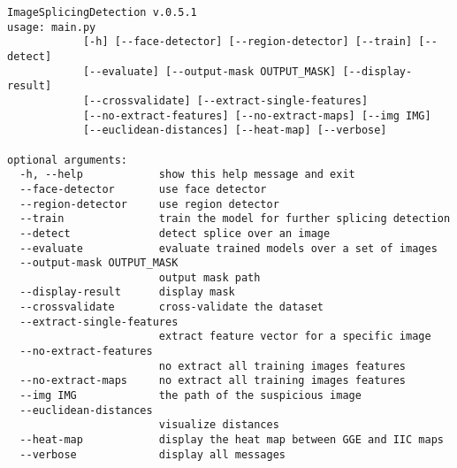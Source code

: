 \begin{footnotesize}
\begin{verbatim}
ImageSplicingDetection v.0.5.1
usage: main.py 
            [-h] [--face-detector] [--region-detector] [--train] [--detect]
            [--evaluate] [--output-mask OUTPUT_MASK] [--display-result]
            [--crossvalidate] [--extract-single-features]
            [--no-extract-features] [--no-extract-maps] [--img IMG]
            [--euclidean-distances] [--heat-map] [--verbose]

optional arguments:
  -h, --help            show this help message and exit
  --face-detector       use face detector
  --region-detector     use region detector
  --train               train the model for further splicing detection
  --detect              detect splice over an image
  --evaluate            evaluate trained models over a set of images
  --output-mask OUTPUT_MASK
                        output mask path
  --display-result      display mask
  --crossvalidate       cross-validate the dataset
  --extract-single-features
                        extract feature vector for a specific image
  --no-extract-features
                        no extract all training images features
  --no-extract-maps     no extract all training images features
  --img IMG             the path of the suspicious image
  --euclidean-distances
                        visualize distances
  --heat-map            display the heat map between GGE and IIC maps
  --verbose             display all messages

\end{verbatim}
\end{footnotesize}